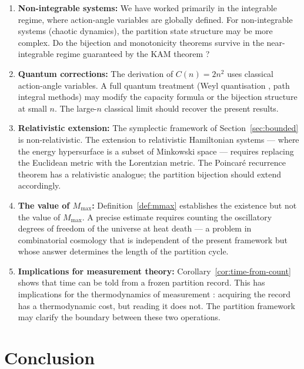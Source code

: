 \documentclass[twocolumn,10pt,a4paper]{article}
\theoremstyle{thmstyle}
\theoremstyle{definition}
\theoremstyle{remark}
\newcommand{\Mmax}{M_{\max}}
\begin{document}
\begin{enumerate}[leftmargin=1.5em,itemsep=0.2em]
\item \textbf{Non-integrable systems:} We have worked primarily in the integrable regime, where action-angle variables are globally defined. For non-integrable systems (chaotic dynamics), the partition state structure may be more complex. Do the bijection and monotonicity theorems survive in the near-integrable regime guaranteed by the KAM theorem \citep{kolmogorov1954,arnold1963,moser1962}?

\item \textbf{Quantum corrections:} The derivation of $C(n) = 2n^2$ uses classical action-angle variables. A full quantum treatment (Weyl quantisation \citep{weyl1912}, path integral methods) may modify the capacity formula or the bijection structure at small $n$. The large-$n$ classical limit should recover the present results.

\item \textbf{Relativistic extension:} The symplectic framework of Section~\ref{sec:bounded} is non-relativistic. The extension to relativistic Hamiltonian systems --- where the energy hypersurface is a subset of Minkowski space --- requires replacing the Euclidean metric with the Lorentzian metric. The Poincar\'e recurrence theorem has a relativistic analogue; the partition bijection should extend accordingly.

\item \textbf{The value of $\Mmax$:} Definition~\ref{def:mmax} establishes the existence but not the value of $\Mmax$. A precise estimate requires counting the oscillatory degrees of freedom of the universe at heat death --- a problem in combinatorial cosmology \citep{penrose2004,penrose2010} that is independent of the present framework but whose answer determines the length of the partition cycle.

\item \textbf{Implications for measurement theory:} Corollary~\ref{cor:time-from-count} shows that time can be told from a frozen partition record. This has implications for the thermodynamics of measurement \citep{landauer1961}: acquiring the record has a thermodynamic cost, but reading it does not. The partition framework may clarify the boundary between these two operations.
\end{enumerate}

\section{Conclusion}
\label{sec:conclusion}
\end{document}
